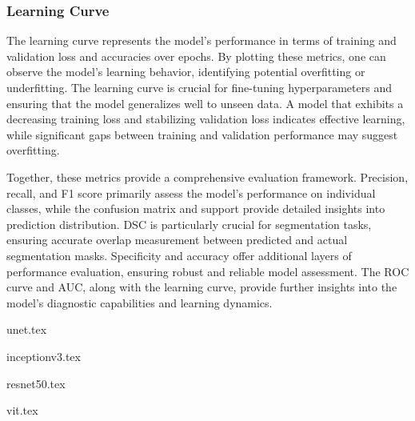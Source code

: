 \subsubsection{Learning Curve}

The learning curve represents the model's performance in terms of training and validation loss and accuracies over epochs. By plotting these metrics, one can observe the model's learning behavior, identifying potential overfitting or underfitting. The learning curve is crucial for fine-tuning hyperparameters and ensuring that the model generalizes well to unseen data. A model that exhibits a decreasing training loss and stabilizing validation loss indicates effective learning, while significant gaps between training and validation performance may suggest overfitting.

Together, these metrics provide a comprehensive evaluation framework. Precision, recall, and F1 score primarily assess the model's performance on individual classes, while the confusion matrix and support provide detailed insights into prediction distribution. DSC is particularly crucial for segmentation tasks, ensuring accurate overlap measurement between predicted and actual segmentation masks. Specificity and accuracy offer additional layers of performance evaluation, ensuring robust and reliable model assessment. The ROC curve and AUC, along with the learning curve, provide further insights into the model's diagnostic capabilities and learning dynamics.




{unet.tex}

{inceptionv3.tex}

{resnet50.tex}

{vit.tex}